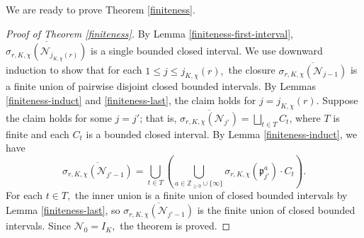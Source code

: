 \documentclass[12pt]{amsart}
\theoremstyle{definition}
\numberwithin{equation}{section}
\newcommand{\p}{\mathfrak{p}}
\newcommand{\Z}{\mathbb{Z}}
\begin{document}
We are ready to prove Theorem \ref{finiteness}.

\begin{proof}[Proof of Theorem \ref{finiteness}]
    By Lemma \ref{finiteness-first-interval}, $\overline{\sigma_{r,K,\chi}(\mathcal{N}_{j_{K,\chi}(r)})}$ is a single bounded closed interval. We use downward induction to show that for each $1 \leq j \leq j_{K,\chi}(r),$ the closure $\overline{\sigma_{r,K,\chi}(\mathcal{N}_{j-1})}$ is a finite union of pairwise disjoint closed bounded intervals. By Lemmas \ref{finiteness-induct} and \ref{finiteness-last}, the claim holds for $j = j_{K,\chi}(r).$ Suppose the claim holds for some $j = j'$; that is, $\overline{\sigma_{r,K,\chi}(\mathcal{N}_{j'})} = \bigsqcup_{t \in T} C_t$, where $T$ is finite and each $C_t$ is a bounded closed interval. By Lemma \ref{finiteness-induct}, we have $$\overline{\sigma_{r,K,\chi}(\mathcal{N}_{j'-1})} = \bigcup_{t \in T} \left( \bigcup_{a \in \Z_{\geq 0} \cup \{\infty\}} \sigma_{r,K,\chi}(\p_{j'}^a) \cdot C_t \right).$$ For each $t \in T,$ the inner union is a finite union of closed bounded intervals by Lemma \ref{finiteness-last}, so $\overline{\sigma_{r,K,\chi}(\mathcal{N}_{j'-1})}$ is the finite union of closed bounded intervals. Since $\mathcal{N}_0 = I_K,$ the theorem is proved.
\end{proof}
\end{document}
